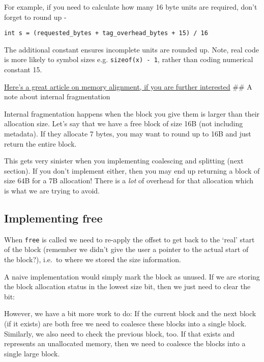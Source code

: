 For example, if you need to calculate how many 16 byte units are
required, don't forget to round up -

\begin{verbatim}
int s = (requested_bytes + tag_overhead_bytes + 15) / 16
\end{verbatim}

The additional constant ensures incomplete units are rounded up. Note,
real code is more likely to symbol sizes e.g. \texttt{sizeof(x)\ -\ 1},
rather than coding numerical constant 15.

\href{http://www.ibm.com/developerworks/library/pa-dalign/}{Here's a
great article on memory alignment, if you are further interested} \#\# A
note about internal fragmentation

Internal fragmentation happens when the block you give them is larger
than their allocation size. Let's say that we have a free block of size
16B (not including metadata). If they allocate 7 bytes, you may want to
round up to 16B and just return the entire block.

This gets very sinister when you implementing coalescing and splitting
(next section). If you don't implement either, then you may end up
returning a block of size 64B for a 7B allocation! There is a \emph{lot}
of overhead for that allocation which is what we are trying to avoid.

\subsection{Implementing free}\label{implementing-free}

When \texttt{free} is called we need to re-apply the offset to get back
to the `real' start of the block (remember we didn't give the user a
pointer to the actual start of the block?), i.e.~to where we stored the
size information.

A naive implementation would simply mark the block as unused. If we are
storing the block allocation status in the lowest size bit, then we just
need to clear the bit:

\begin{Shaded}
\begin{Highlighting}[]
\NormalTok{; }
\end{Highlighting}
\end{Shaded}

However, we have a bit more work to do: If the current block and the
next block (if it exists) are both free we need to coalesce these blocks
into a single block. Similarly, we also need to check the previous
block, too. If that exists and represents an unallocated memory, then we
need to coalesce the blocks into a single large block.

